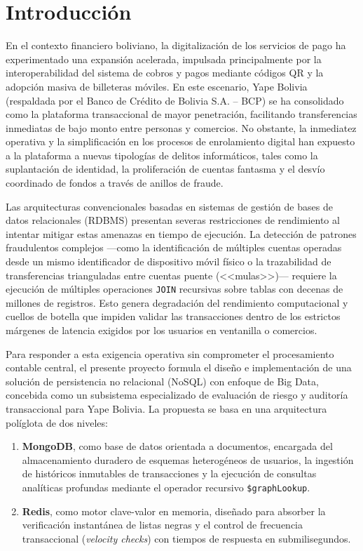 \documentclass[11pt,a4paper]{article}
\begin{document}
	\section{Introducción}
	En el contexto financiero boliviano, la digitalización de los servicios de pago ha experimentado una expansión acelerada, impulsada principalmente por la interoperabilidad del sistema de cobros y pagos mediante códigos QR y la adopción masiva de billeteras móviles. En este escenario, Yape Bolivia (respaldada por el Banco de Crédito de Bolivia S.A. -- BCP) se ha consolidado como la plataforma transaccional de mayor penetración, facilitando transferencias inmediatas de bajo monto entre personas y comercios. No obstante, la inmediatez operativa y la simplificación en los procesos de enrolamiento digital han expuesto a la plataforma a nuevas tipologías de delitos informáticos, tales como la suplantación de identidad, la proliferación de cuentas fantasma y el desvío coordinado de fondos a través de anillos de fraude.
	
	Las arquitecturas convencionales basadas en sistemas de gestión de bases de datos relacionales (RDBMS) presentan severas restricciones de rendimiento al intentar mitigar estas amenazas en tiempo de ejecución. La detección de patrones fraudulentos complejos ---como la identificación de múltiples cuentas operadas desde un mismo identificador de dispositivo móvil físico o la trazabilidad de transferencias trianguladas entre cuentas puente (<<mulas>>)--- requiere la ejecución de múltiples operaciones \texttt{JOIN} recursivas sobre tablas con decenas de millones de registros. Esto genera degradación del rendimiento computacional y cuellos de botella que impiden validar las transacciones dentro de los estrictos márgenes de latencia exigidos por los usuarios en ventanilla o comercios.
	
	Para responder a esta exigencia operativa sin comprometer el procesamiento contable central, el presente proyecto formula el diseño e implementación de una solución de persistencia no relacional (NoSQL) con enfoque de Big Data, concebida como un subsistema especializado de evaluación de riesgo y auditoría transaccional para Yape Bolivia. La propuesta se basa en una arquitectura políglota de dos niveles:
	\begin{enumerate}[leftmargin=2em]
		\item \textbf{MongoDB}, como base de datos orientada a documentos, encargada del almacenamiento duradero de esquemas heterogéneos de usuarios, la ingestión de históricos inmutables de transacciones y la ejecución de consultas analíticas profundas mediante el operador recursivo \texttt{\$graphLookup}.
		\item \textbf{Redis}, como motor clave-valor en memoria, diseñado para absorber la verificación instantánea de listas negras y el control de frecuencia transaccional (\textit{velocity checks}) con tiempos de respuesta en submilisegundos.
	\end{enumerate}
	
\end{document}
